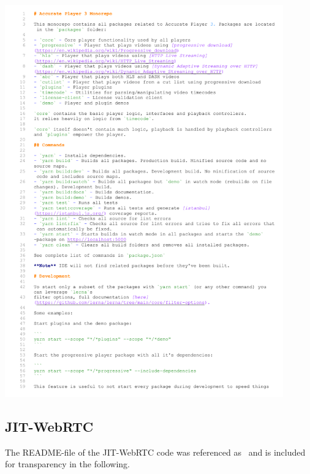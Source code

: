 \documentclass[../MasterThesis.tex]{subfiles}
\begin{document}
\includegraphics[page=2, width=0.9\textwidth]{FE.pdf}



\newpage
\subsection{JIT-WebRTC} \label{appendix:readmejitwebrtc}

The README-file of the JIT-WebRTC code was referenced as~\cite{RM_Backend} and is included for transparency in the following.
\end{document}
